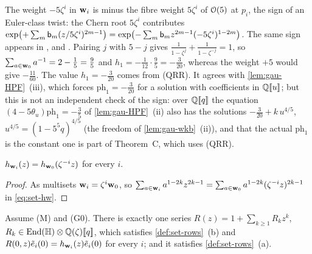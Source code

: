 \begin{rmk}
\label{rmk:set-qrrsign}
The weight $-5\zeta^i$ in $\mathbf{w}_i$ is minus the fibre weight $5\zeta^i$ of $\mathcal{O}(5)$ at $p_i$, the sign of an Euler-class twist: the Chern root $5\zeta^i$ contributes $\exp\bigl(+\sum_m\mathsf{b}_m(z/5\zeta^i)^{2m-1}\bigr)=\exp\bigl(-\sum_m\mathsf{b}_mz^{2m-1}(-5\zeta^i)^{1-2m}\bigr)$. The same sign appears in \cite[(17)]{GJR18}, \cite[Corollary~1]{MR2276766} and \cite[(26)]{LP20}. Pairing $j$ with $5-j$ gives $\frac1{1-\zeta^j}+\frac1{1-\zeta^{-j}}=1$, so $\sum_{a\in\mathbf{w}_0}a^{-1}=2-\frac15=\frac95$ and $h_1=-\frac1{12}\cdot\frac95=-\frac3{20}$, whereas the weight $+5$ would give $-\frac{11}{60}$. The value $h_1=-\frac3{20}$ comes from (QRR). It agrees with \cref{lem:gau-HPF}~(iii), which forces $\mathrm{ph}_1=-\frac3{20}$ for a solution with coefficients in $\mathbb{Q}[\![ u ]\!]$; but this is not an independent check of the sign: over $\mathbb{Q}[\![ q ]\!]$ the equation $(4-5\theta_u)\mathrm{ph}_1=-\frac35$ of \cref{lem:gau-HPF}~(ii) also has the solutions $-\frac3{20}+k\,u^{4/5}$, $u^{4/5}=(1-5^5q)^{4/5}$ (the freedom of \cref{lem:gau-wkb}~(ii)), and that the actual $\mathrm{ph}_1$ is the constant one is part of Theorem~C, which uses (QRR).
\end{rmk}

\begin{lem}
\label{lem:set-hrot}
$h_{\mathbf{w}_i}(z)=h_{\mathbf{w}_0}(\zeta^{-i}z)$ for every $i$.
\end{lem}

\begin{proof}
As multisets $\mathbf{w}_i=\zeta^i\mathbf{w}_0$, so $\sum_{a\in\mathbf{w}_i}a^{1-2k}z^{2k-1}=\sum_{a\in\mathbf{w}_0}a^{1-2k}(\zeta^{-i}z)^{2k-1}$ in \eqref{eq:set-hw}.
\end{proof}

\begin{lem}[Flatness and the value at $q=0$ determine $R$]
\label{lem:set-Runique}
Assume (M) and (G0). There is exactly one series $R(z)=1+\sum_{k\geq1}R_kz^k$, $R_k\in\operatorname{End}(\mathbb{H})\otimes\mathbb{Q}(\zeta)[\![ q ]\!]$, which satisfies \cref{def:set-rows}~(b) and $R(0,z)\tilde e_i(0)=h_{\mathbf{w}_i}(z)\tilde e_i(0)$ for every $i$; and it satisfies \cref{def:set-rows}~(a).
\end{lem}

